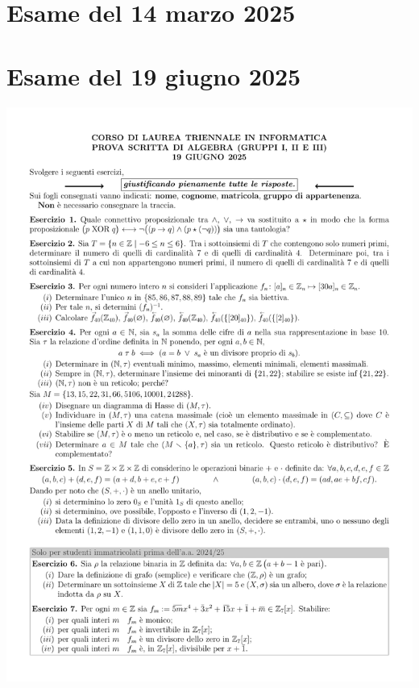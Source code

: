 \section{Esame del 14 marzo 2025}

\section{Esame del 19 giugno 2025}
\begin{center}
    \includegraphics[scale=.85]{pdf/25-06-19.pdf}
\end{center}

